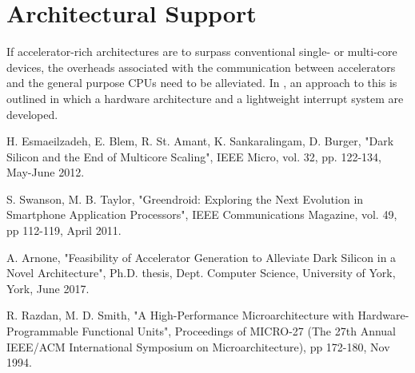 \documentclass{report}
\begin{document}
\section{Architectural Support}

If accelerator-rich architectures are to surpass conventional single- or multi-core devices, the overheads associated with
the communication between accelerators and the general purpose CPUs need to be alleviated. In \cite{accelerator-rich-cmp},
an approach to this is outlined in which a hardware architecture and a lightweight interrupt system are developed.

\begin{thebibliography}{9}
H. Esmaeilzadeh, E. Blem, R. St. Amant, K. Sankaralingam, D. Burger, "Dark Silicon and the End of Multicore Scaling", IEEE Micro, vol. 32, pp. 122-134, May-June 2012.

S. Swanson, M. B. Taylor, "Greendroid: Exploring the Next Evolution in Smartphone Application Processors", IEEE Communications Magazine, vol. 49, pp 112-119, April 2011.

A. Arnone, "Feasibility of Accelerator Generation to Alleviate Dark Silicon in a Novel Architecture", Ph.D. thesis, Dept. Computer Science, University of York, York, June 2017.

R. Razdan, M. D. Smith, "A High-Performance Microarchitecture with Hardware-Programmable Functional Units", Proceedings of MICRO-27 (The 27th Annual IEEE/ACM International Symposium on Microarchitecture), pp 172-180, Nov 1994.

\end{thebibliography}
\end{document}
